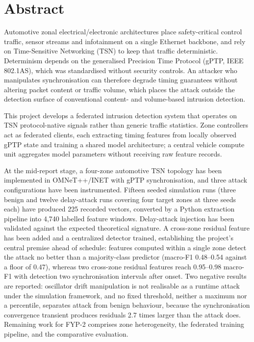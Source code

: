 \chapter*{Abstract}
Automotive zonal electrical/electronic architectures place safety-critical control
traffic, sensor streams and infotainment on a single Ethernet backbone, and rely on
Time-Sensitive Networking (TSN) to keep that traffic deterministic. Determinism
depends on the generalised Precision Time Protocol (gPTP, IEEE 802.1AS), which was
standardised without security controls. An attacker who manipulates synchronisation
can therefore degrade timing guarantees without altering packet content or traffic
volume, which places the attack outside the detection surface of conventional
content- and volume-based intrusion detection.

This project develops a federated intrusion detection system that operates on
TSN protocol-native signals rather than generic traffic statistics. Zone controllers
act as federated clients, each extracting timing features from locally observed gPTP
state and training a shared model architecture; a central vehicle compute unit
aggregates model parameters without receiving raw feature records.

At the mid-report stage, a four-zone automotive TSN topology has been implemented in
OMNeT++/INET with gPTP synchronisation, and three attack configurations have been
instrumented. Fifteen seeded simulation runs (three benign and twelve delay-attack runs covering
four target zones at three seeds each) have produced 225 recorded vectors,
converted by a Python extraction pipeline into 4{,}740 labelled feature windows.
Delay-attack injection has been validated against the expected theoretical signature.
A cross-zone residual feature has been added and a centralized detector trained,
establishing the project's central premise ahead of schedule: features computed within
a single zone detect the attack no better than a majority-class predictor
(macro-F1 0.48--0.54 against a floor of 0.47), whereas two cross-zone residual features
reach 0.95--0.98 macro-F1 with detection two synchronisation intervals after onset.
Two negative results are reported: oscillator drift manipulation is not realisable as
a runtime attack under the simulation framework, and no fixed threshold, neither a
maximum nor a percentile, separates attack from benign behaviour, because the
synchronisation convergence transient produces residuals 2.7 times larger than the
attack does. Remaining work for FYP-2 comprises zone heterogeneity, the federated
training pipeline, and the comparative evaluation.
